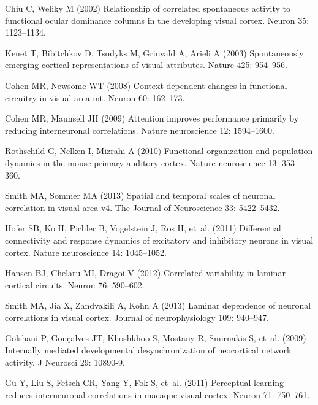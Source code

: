 \begin{thebibliography}{100}
Chiu C, Weliky M (2002) Relationship of correlated spontaneous activity to
  functional ocular dominance columns in the developing visual cortex.
\newblock Neuron 35: 1123--1134.

Kenet T, Bibitchkov D, Tsodyks M, Grinvald A, Arieli A (2003) Spontaneously
  emerging cortical representations of visual attributes.
\newblock Nature 425: 954--956.

Cohen MR, Newsome WT (2008) Context-dependent changes in functional circuitry
  in visual area mt.
\newblock Neuron 60: 162--173.

Cohen MR, Maunsell JH (2009) Attention improves performance primarily by
  reducing interneuronal correlations.
\newblock Nature neuroscience 12: 1594--1600.

Rothschild G, Nelken I, Mizrahi A (2010) Functional organization and population
  dynamics in the mouse primary auditory cortex.
\newblock Nature neuroscience 13: 353--360.

Smith MA, Sommer MA (2013) Spatial and temporal scales of neuronal correlation
  in visual area v4.
\newblock The Journal of Neuroscience 33: 5422--5432.

Hofer SB, Ko H, Pichler B, Vogelstein J, Ros H, et~al. (2011) Differential
  connectivity and response dynamics of excitatory and inhibitory neurons in
  visual cortex.
\newblock Nature neuroscience 14: 1045--1052.

Hansen BJ, Chelaru MI, Dragoi V (2012) Correlated variability in laminar
  cortical circuits.
\newblock Neuron 76: 590--602.

Smith MA, Jia X, Zandvakili A, Kohn A (2013) Laminar dependence of neuronal
  correlations in visual cortex.
\newblock Journal of neurophysiology 109: 940--947.

Golshani P, Gon{\c c}alves JT, Khoshkhoo S, Mostany R, Smirnakis S, et~al.
  (2009) Internally mediated developmental desynchronization of neocortical
  network activity.
\newblock J Neurosci 29: 10890-9.

Gu Y, Liu S, Fetsch CR, Yang Y, Fok S, et~al. (2011) Perceptual learning
  reduces interneuronal correlations in macaque visual cortex.
\newblock Neuron 71: 750--761.


\end{thebibliography}
